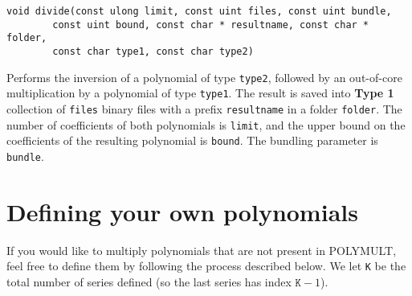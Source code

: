 \documentclass[a4paper,10pt]{article}
\newcommand{\code}{\lstinline}
\begin{document}
\begin{lstlisting}
void divide(const ulong limit, const uint files, const uint bundle,
	    const uint bound, const char * resultname, const char * folder,
	    const char type1, const char type2)
\end{lstlisting}

Performs the inversion of a polynomial of type \code{type2}, followed by an out-of-core multiplication by a polynomial of type \code{type1}. The result is saved into \textbf{Type 1} collection of \texttt{files} binary files with a prefix \code{resultname} in a folder \code{folder}. The number of coefficients of both polynomials is \code{limit}, and the upper bound on the coefficients of the resulting polynomial is \code{bound}. The bundling parameter is \code{bundle}.




\section{Defining your own polynomials}

If you would like to multiply polynomials that are not present in POLYMULT, feel free to define them by following the process described below. We let \code{K} be the total number of series defined (so the last series has index $\texttt{K}-1$).
\end{document}
